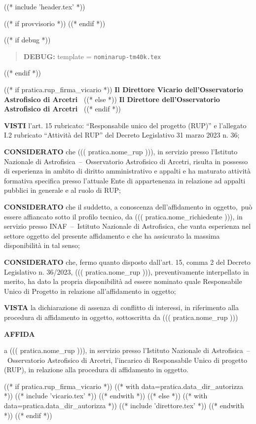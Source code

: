 
((* include 'header.tex' *))

((* if provvisorio *))
((* endif *))


\topaddr
((* if debug *))
\begin{quotation}
	\textbf{DEBUG:} template = \texttt{nominarup-tm40k.tex}
\end{quotation}
((* endif *))

\begin{center}
((* if pratica.rup_firma_vicario *))
\textbf{Il Direttore Vicario dell’Osservatorio Astrofisico di Arcetri }
((* else *))
\textbf{Il Direttore dell’Osservatorio Astrofisico di Arcetri }
((* endif *))
\end{center}

\textbf{VISTI}	l’art. 15 rubricato: ``Responsabile unico del progetto (RUP)'' e l’allegato I.2 rubricato
``Attività del RUP'' del Decreto Legislativo 31 marzo 2023 n. 36;

\textbf{CONSIDERATO} 	che ((( pratica.nome_rup ))), in servizio presso l’Istituto Nazionale di
Astrofisica~–~Osservatorio Astrofisico di Arcetri, risulta in possesso di esperienza in ambito di diritto
amministrativo e appalti e ha maturato attività formativa specifica presso l’attuale Ente di appartenenza
in relazione ad appalti pubblici in generale e al ruolo di RUP;

\textbf{CONSIDERATO} che il suddetto, a conoscenza dell’affidamento in oggetto, può essere affiancato sotto il
profilo tecnico, da ((( pratica.nome_richiedente ))), in servizio presso INAF~–~Istituto Nazionale di
Astrofisica, che vanta esperienza nel settore oggetto del presente affidamento e che ha assicurato la
massima disponibilità in tal senso;

\textbf{CONSIDERATO} 	che, fermo quanto disposto dall’art. 15, comma 2 del Decreto Legislativo n. 36/2023,
((( pratica.nome_rup ))), preventivamente interpellato in merito, ha dato la propria disponibilità ad
essere nominato quale Responsabile Unico di Progetto in relazione all’affidamento in oggetto;

\textbf{VISTA}	la dichiarazione di assenza di conflitto di interessi, in riferimento alla procedura di affidamento
in oggetto, sottoscritta da ((( pratica.nome_rup )))

\begin{center}
	\textbf{AFFIDA}
\end{center}

a ((( pratica.nome_rup ))), in servizio presso l’Istituto Nazionale di Astrofisica~–~Osservatorio
Astrofisico di Arcetri, l’incarico di Responsabile Unico di progetto (RUP), in relazione alla procedura
di affidamento in oggetto.

((* if pratica.rup_firma_vicario *))
((* with data=pratica.data_dir_autorizza *))
((* include 'vicario.tex' *))
((* endwith *))
((* else *))
((* with data=pratica.data_dir_autorizza *))
((* include 'direttore.tex' *))
((* endwith *))
((* endif *))

